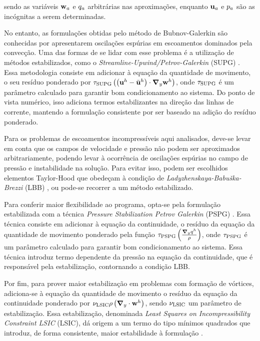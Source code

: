 \noindent sendo as variáveis $\mathbf{w}_{a}$ e $q_{a}$ arbitrárias nas aproximações, enquanto $\mathbf{u}_{a}$ e $p_{a}$ são as incógnitas a serem determinadas.

No entanto, as formulações obtidas pelo método de Bubnov-Galerkin são conhecidas por apresentarem oscilações espúrias em escoamentos dominados pela convecção. Uma das formas de se lidar com esse problema é a utilização de métodos estabilizados, como o \textit{Streamline-Upwind/Petrov-Galerkin} (SUPG) \cite{BrooksH:1982, HughesT:1984}. Essa metodologia consiste em adicionar à equação da quantidade de movimento, o seu resíduo ponderado por $\tau_{\mathrm{SUPG}} \left(\left(\mathbf{u}^h - \bar{\mathbf{u}}^h \right) \cdot \boldsymbol{\nabla}_y \mathbf{w}^h\right)$, onde $\tau_{\mathrm{SUPG}}$ é um parâmetro calculado para garantir bom condicionamento ao sistema. Do ponto de vista numérico, isso adiciona termos estabilizantes na direção das linhas de corrente, mantendo a formulação consistente por ser baseado na adição do resíduo ponderado.

Para os problemas de escoamentos incompressíveis aqui analisados, deve-se levar em conta que os campos de velocidade e pressão não podem ser aproximados arbitrariamente, podendo levar à ocorrência de oscilações espúrias no campo de pressão e instabilidade na solução. Para evitar isso, podem ser escolhidos elementos Taylor-Hood que obedeçam à condição de \textit{Ladyzhenskaya-Babuška-Brezzi} (LBB) \cite{BrezziF:1991,StrangF:2008,ZienkiewiczTN:2005b}, ou pode-se recorrer a um método estabilizado. 

Para conferir maior flexibilidade ao programa, opta-se pela formulação estabilizada com a técnica \textit{Pressure Stabilization Petrov Galerkin} (PSPG)  \cite{HughesFB:1986,TezduyarMRS:1992a}. Essa técnica consiste em adicionar à equação da continuidade, o resíduo da equação da quantidade de movimento ponderado pela função $\tau_{\mathrm{PSPG}} \left(\frac{\boldsymbol{\nabla}_y q^h}{\rho}\right)$, onde $\tau_{\mathrm{PSPG}}$ é um parâmetro calculado para garantir bom condicionamento ao sistema. Essa técnica introduz termo dependente da pressão na equação da continuidade, que é responsável pela estabilização, contornando a condição LBB.

Por fim, para prover maior estabilização em problemas com formação de vórtices, adiciona-se à equação da quantidade de movimento o resíduo da equação da continuidade ponderado por $ \nu_{\mathrm{LSIC}} \rho \left(\boldsymbol{\nabla}_y \cdot \mathbf{w}^h\right)$, sendo $\nu_{\mathrm{LSIC}}$ um parâmetro de estabilização. Essa estabilização, denominada \textit{Least Squares on Incompressibility Constraint LSIC} (LSIC), dá origem a um termo do tipo mínimos quadrados que introduz, de forma consistente, maior estabilidade à formulação \cite{BazilevsTT:2013a,TezduyarO:2000}.

